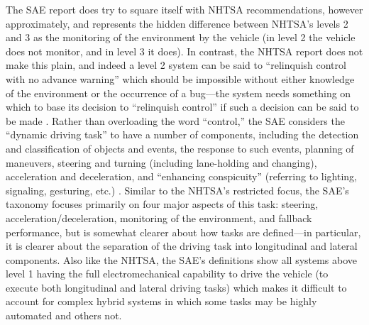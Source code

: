 The SAE report does try to square itself with NHTSA recommendations,
however approximately, and represents the hidden difference between
NHTSA's levels 2 and 3 as the monitoring of the environment by the
vehicle (in level 2 the vehicle does not monitor, and in level 3 it
does). In contrast, the NHTSA report does not make this plain, and
indeed a level 2 system can be said to ``relinquish control with no
advance warning'' which should be impossible without either knowledge of the
environment or the occurrence of a bug---the system needs something on
which to base its decision to ``relinquish control'' if such a decision
can be said to be made \cite[p. 5]{NHTSA}. Rather than overloading the word ``control,''
the SAE considers the ``dynamic driving task'' to have a number of
components, including the detection and classification of objects and
events, the response to such events, planning of maneuvers, steering
and turning (including lane-holding and changing), acceleration and
deceleration, and ``enhancing conspicuity'' (referring to lighting,
signaling, gesturing, etc.) \cite[p. 6]{SAE}. Similar to the NHTSA's
restricted focus, the SAE's taxonomy 
focuses primarily on four major aspects of this task:
steering, acceleration/deceleration, monitoring of the environment,
and fallback performance, but is somewhat clearer about how tasks are
defined---in particular, it is clearer about the separation of the
driving task into longitudinal and lateral components. Also like the
NHTSA, the SAE's definitions show all systems above level 1 having the
full electromechanical capability to drive the vehicle (to execute
both longitudinal and lateral driving tasks) which makes it difficult
to account for complex hybrid systems in which some tasks may be
highly automated and others not.



